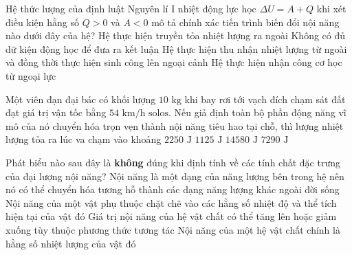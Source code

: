 \begin{ex}	Hệ thức lượng của định luật Nguyên lí I nhiệt động lực học $\Delta U = A + Q$ khi xét điều kiện hằng số $Q > 0$ và $A < 0$ mô tả chính xác tiến trình biến đổi nội năng nào dưới đây của hệ?
	\choice
	{Hệ thực hiện truyền tỏa nhiệt lượng ra ngoài}
	{Không có đủ dữ kiện động học để đưa ra kết luận}
	{\True Hệ thực hiện thu nhận nhiệt lượng từ ngoài và đồng thời thực hiện sinh công lên ngoại cảnh}
	{Hệ thực hiện nhận công cơ học từ ngoại lực}
\end{ex}

\begin{ex}	Một viên đạn đại bác có khối lượng $10\text{ kg}$ khi bay rơi tới vạch đích chạm sát đất đạt giá trị vận tốc bằng $54\text{ km/h solos}$. Nếu giả định toàn bộ phần động năng vĩ mô của nó chuyển hóa trọn vẹn thành nội năng tiêu hao tại chỗ, thì lượng nhiệt lượng tỏa ra lúc va chạm vào khoảng
	\choice
	{$2250\text{ J}$}
	{\True $1125\text{ J}$}
	{$14580\text{ J}$}
	{$7290\text{ J}$}
\end{ex}

\begin{ex}	Phát biểu nào sau đây là \textbf{không} đúng khi định tính về các tính chất đặc trưng của đại lượng nội năng?
	\choice
	{Nội năng là một dạng của năng lượng bên trong hệ nên nó có thể chuyển hóa tương hỗ thành các dạng năng lượng khác ngoài đời sống}
	{Nội năng của một vật phụ thuộc chặt chẽ vào các hằng số nhiệt độ và thể tích hiện tại của vật đó}
	{Giá trị nội năng của hệ vật chất có thể tăng lên hoặc giảm xuống tùy thuộc phương thức tương tác}
	{\True Nội năng của một hệ vật chất chính là hằng số nhiệt lượng của vật đó}
\end{ex}

